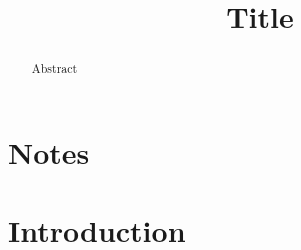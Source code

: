 \documentclass[runningheads]{llncs}
\begin{document}
%
\title{Title}
%
%
%
%
%
\maketitle              %
%
\begin{abstract}
  Abstract

\end{abstract}
\section{Notes}

\section{Introduction}




\end{document}
